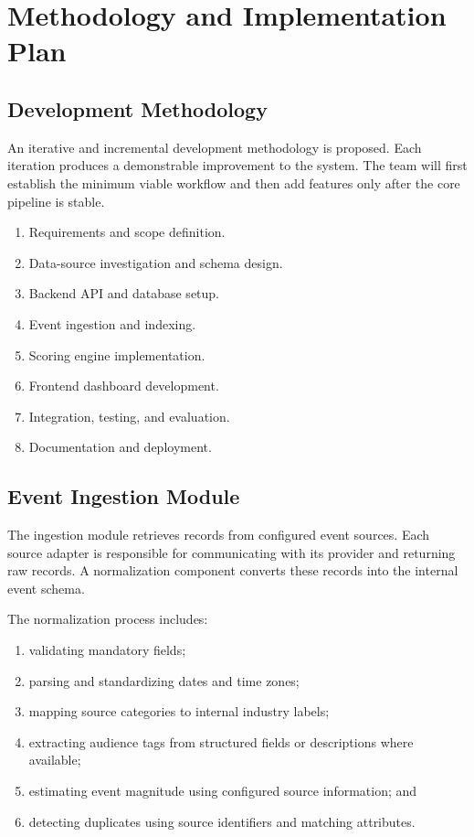 \documentclass[12pt]{article}
\begin{document}
\section{Methodology and Implementation Plan}

\subsection{Development Methodology}
An iterative and incremental development methodology is proposed. Each iteration produces a demonstrable improvement to the system. The team will first establish the minimum viable workflow and then add features only after the core pipeline is stable.

\begin{enumerate}[leftmargin=0.7cm]
\item Requirements and scope definition.
\item Data-source investigation and schema design.
\item Backend API and database setup.
\item Event ingestion and indexing.
\item Scoring engine implementation.
\item Frontend dashboard development.
\item Integration, testing, and evaluation.
\item Documentation and deployment.
\end{enumerate}

\subsection{Event Ingestion Module}
The ingestion module retrieves records from configured event sources. Each source adapter is responsible for communicating with its provider and returning raw records. A normalization component converts these records into the internal event schema.

The normalization process includes:
\begin{enumerate}[leftmargin=0.7cm]
\item validating mandatory fields;
\item parsing and standardizing dates and time zones;
\item mapping source categories to internal industry labels;
\item extracting audience tags from structured fields or descriptions where available;
\item estimating event magnitude using configured source information; and
\item detecting duplicates using source identifiers and matching attributes.
\end{enumerate}
\end{document}

